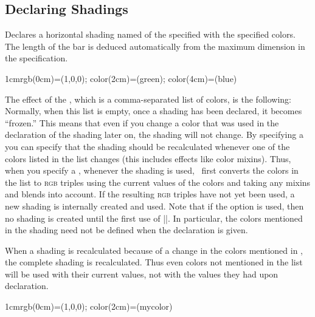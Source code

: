 \subsection{Declaring Shadings}

\begin{command}{\pgfdeclarehorizontalshading{}}
  Declares a horizontal shading named  of the specified
   with the specified colors. The length of the bar is
  deduced automatically from the maximum dimension in the specification.

\begin{codeexample}[]
  {1cm}{rgb(0cm)=(1,0,0); color(2cm)=(green); color(4cm)=(blue)}
\end{codeexample}

  The effect of the , which is a
  comma-separated list of colors, is the following: Normally, when
  this list is empty, once a shading has been declared, it becomes
  ``frozen.'' This means that even if you change a color that was used
  in the declaration of the shading later on, the shading will not
  change. By specifying a  you can specify
  that the shading should be recalculated whenever one of the colors
  listed in the list changes (this includes effects like color
  mixins). Thus, when you specify a ,
  whenever the shading is used, \pgfname\ first converts the colors in the
  list to \textsc{rgb} triples using the current values of the
  colors and taking any mixins and blends into account. If the
  resulting \textsc{rgb} triples have not yet been   used, a new
  shading is internally created and used. Note that if the 
  option  is used, then no shading is created until
  the first use of |\pgfuseshading|. In particular, the colors
  mentioned in the shading need not be defined when the declaration is
  given.

  When a shading is recalculated because of a change in the
  colors mentioned in , the complete shading
  is recalculated. Thus even colors not mentioned in the list will be
  used with their current values, not with the values they had upon
  declaration.
  
\begin{codeexample}[]
  {1cm}{rgb(0cm)=(1,0,0); color(2cm)=(mycolor)}
\end{codeexample}
\end{command}


